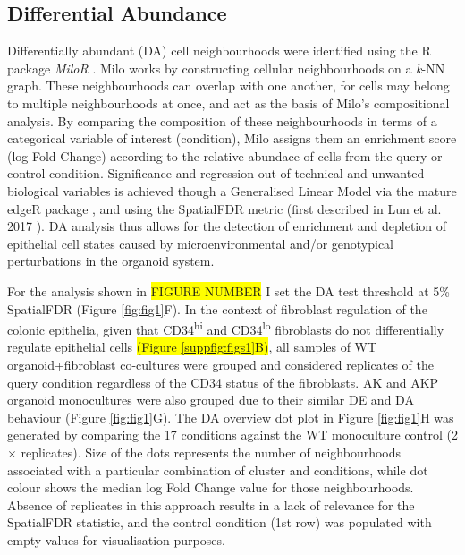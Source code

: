 \subsection*{Differential Abundance}

Differentially abundant (DA) cell neighbourhoods were identified using the R package \textit{MiloR} \cite{dann_differential_2022}. Milo works by constructing cellular neighbourhoods on a \emph{k}-NN graph. These neighbourhoods can overlap with one another, for cells may belong to multiple neighbourhoods at once, and act as the basis of Milo's compositional analysis. By comparing the composition of these neighbourhoods in terms of a categorical variable of interest (condition), Milo assigns them an enrichment score (log Fold Change) according to the relative abundace of cells from the query or control condition. Significance and regression out of technical and unwanted biological variables is achieved though a Generalised Linear Model via the mature edgeR package \cite{robinson_edger_2010}, and using the SpatialFDR metric (first described in Lun et al. 2017 \cite{lun_testing_2017}).
DA analysis thus allows for the detection of enrichment and depletion of epithelial cell states caused by microenvironmental and/or genotypical perturbations in the organoid system. 

For the analysis shown in \colorbox{yellow}{FIGURE NUMBER} I set the DA test threshold at 5\% SpatialFDR (Figure \ref{fig:fig1}F). In the context of fibroblast regulation of the colonic epithelia, given that CD34\textsuperscript{hi} and CD34\textsuperscript{lo} fibroblasts do not differentially regulate epithelial cells \colorbox{yellow}{(Figure \ref{suppfig:figs1}B)}, all samples of WT organoid+fibroblast co-cultures were grouped and considered replicates of the query condition regardless of the CD34 status of the fibroblasts. AK and AKP organoid monocultures were also grouped due to their similar DE and DA behaviour (Figure \ref{fig:fig1}G).
The DA overview dot plot in Figure \ref{fig:fig1}H was generated by comparing the 17 conditions against the WT monoculture control (2$\times$ replicates). Size of the dots represents the number of neighbourhoods associated with a particular combination of cluster and conditions, while dot colour shows the median log Fold Change value for those neighbourhoods. Absence of replicates in this approach results in a lack of relevance for the SpatialFDR statistic, and the control condition (1st row) was populated with empty values for visualisation purposes. 

